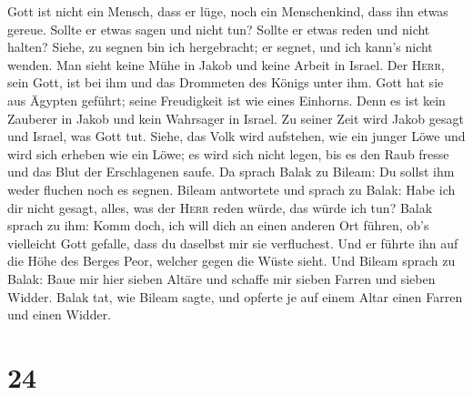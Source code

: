  Gott ist nicht ein Mensch, dass er lüge, noch ein
Menschenkind, dass ihn etwas gereue. Sollte er etwas sagen und nicht
tun? Sollte er etwas reden und nicht halten?  Siehe, zu
segnen bin ich hergebracht; er segnet, und ich kann's nicht wenden.
 Man sieht keine Mühe in Jakob und keine Arbeit in
Israel. Der \textsc{Herr}, sein Gott, ist bei ihm und das Drommeten des
Königs unter ihm.  Gott hat sie aus Ägypten geführt;
seine Freudigkeit ist wie eines Einhorns.  Denn es ist
kein Zauberer in Jakob und kein Wahrsager in Israel. Zu seiner Zeit wird
Jakob gesagt und Israel, was Gott tut.  Siehe, das Volk
wird aufstehen, wie ein junger Löwe und wird sich erheben wie ein Löwe;
es wird sich nicht legen, bis es den Raub fresse und das Blut der
Erschlagenen saufe.  Da sprach Balak zu Bileam: Du sollst
ihm weder fluchen noch es segnen.  Bileam antwortete und
sprach zu Balak: Habe ich dir nicht gesagt, alles, was der \textsc{Herr}
reden würde, das würde ich tun?  Balak sprach zu ihm:
Komm doch, ich will dich an einen anderen Ort führen, ob's vielleicht
Gott gefalle, dass du daselbst mir sie verfluchest.  Und
er führte ihn auf die Höhe des Berges Peor, welcher gegen die Wüste
sieht.  Und Bileam sprach zu Balak: Baue mir hier sieben
Altäre und schaffe mir sieben Farren und sieben Widder. 
Balak tat, wie Bileam sagte, und opferte je auf einem Altar einen Farren
und einen Widder.

\hypertarget{section-23}{%
\section{24}\label{section-23}}

